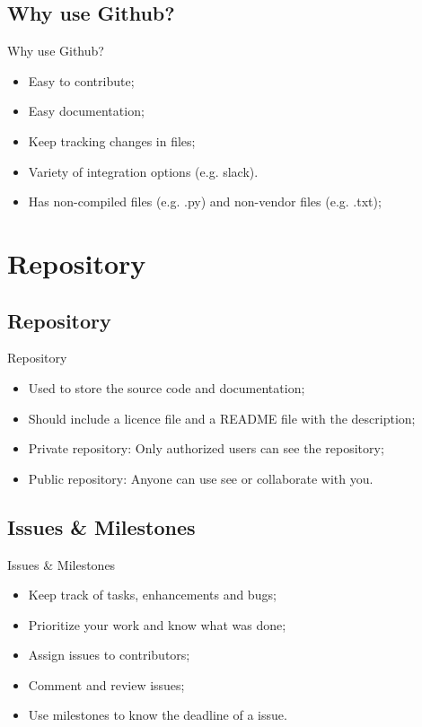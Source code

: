 \subsection{Why use Github?}
\begin{frame}{Why use Github?}
\begin{itemize}
    \item Easy to contribute;
    \item Easy documentation;
    \item Keep tracking changes in files;
    \item Variety of integration options (e.g. slack).
    \item Has non-compiled files (e.g. .py) and non-vendor files (e.g. .txt);
\end{itemize}
\end{frame}

\section{Repository}
\subsection{Repository}
\begin{frame}{Repository}
    \begin{itemize}
        \item Used to store the source code and documentation;
        \item Should include a licence file and a README file with the description;
        \item Private repository: Only authorized users can see the repository;
        \item Public repository: Anyone can use see or collaborate with you.      
    \end{itemize}
\end{frame}

\subsection{Issues \& Milestones}
\begin{frame}{Issues \& Milestones}
    \begin{itemize}
        \item Keep track of tasks, enhancements and bugs;
        \item Prioritize your work and know what was done;
        \item Assign issues to contributors;
        \item Comment and review issues;
        \item Use milestones to know the deadline of a issue.
    \end{itemize}
\end{frame}

